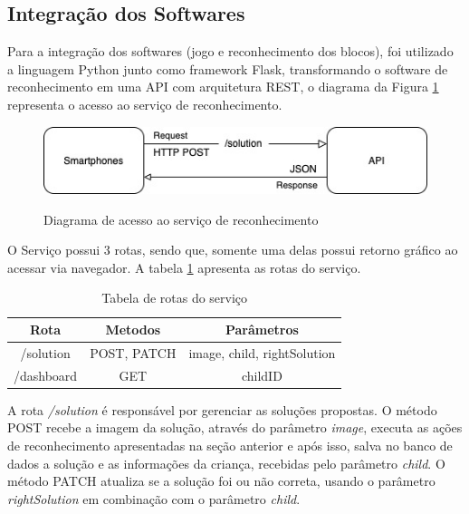     \subsection {Integração dos Softwares}
    
    Para a integração dos softwares (jogo e reconhecimento dos blocos), foi utilizado a linguagem Python junto como framework Flask, transformando o software de reconhecimento em uma API com arquitetura REST, o diagrama da Figura \ref{figura:diagrama_acesso_integracao} representa o acesso ao serviço de reconhecimento.
    
    \begin{figure}[H]
        \caption{Diagrama de acesso ao serviço de reconhecimento}
        \centering
        \includegraphics[width=15cm]{Imagens/Cap4/diagrama_acesso_integracao.jpg}
        \label{figura:diagrama_acesso_integracao}
    \end{figure}
    
    O Serviço possui 3 rotas, sendo que, somente uma delas possui retorno gráfico ao acessar via navegador. A tabela \ref{tab:rotas} apresenta as rotas do serviço.
    
    \begin{table}[H]
        \centering
        \caption{Tabela de rotas do serviço}
        \label{tab:rotas}
        \begin{tabular}{|c|c|c|}
            \hline
            {Rota} & {Metodos} & {Parâmetros}  \\ \hline
            /solution & POST, PATCH & image, child, rightSolution \\ \hline
            /dashboard & GET & childID \\ \hline
        \end{tabular}
    \end{table}
    
    A rota \textit{/solution} é responsável por gerenciar as soluções propostas. O método POST recebe a imagem da solução, através do parâmetro \textit{image}, executa as ações de reconhecimento apresentadas na seção anterior e após isso, salva no banco de dados a solução e as informações da criança, recebidas pelo parâmetro \textit{child}. O método PATCH atualiza se a solução foi ou não correta, usando o parâmetro \textit{rightSolution} em combinação com o parâmetro \textit{child}.
    
